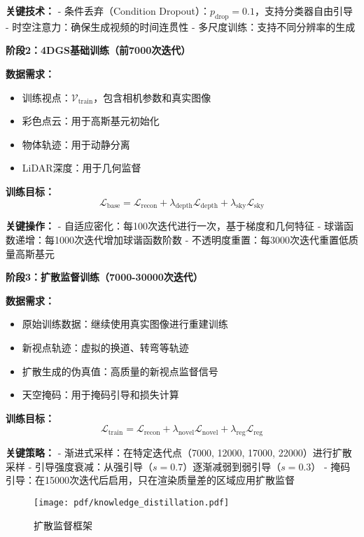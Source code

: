\textbf{关键技术：}
- 条件丢弃（Condition Dropout）：$p_{\text{drop}} = 0.1$，支持分类器自由引导
- 时空注意力：确保生成视频的时间连贯性
- 多尺度训练：支持不同分辨率的生成

\textbf{阶段2：4DGS基础训练（前7000次迭代）}

\textbf{数据需求：}
\begin{itemize}
\item 训练视点：$\mathcal{V}_{\text{train}}$，包含相机参数和真实图像
\item 彩色点云：用于高斯基元初始化
\item 物体轨迹：用于动静分离
\item LiDAR深度：用于几何监督
\end{itemize}

\textbf{训练目标：}
\begin{equation}
\mathcal{L}_{\text{base}} = \mathcal{L}_{\text{recon}} + \lambda_{\text{depth}} \mathcal{L}_{\text{depth}} + \lambda_{\text{sky}} \mathcal{L}_{\text{sky}}
\label{eq:base_training}
\end{equation}

\textbf{关键操作：}
- 自适应密化：每100次迭代进行一次，基于梯度和几何特征
- 球谐函数递增：每1000次迭代增加球谐函数阶数
- 不透明度重置：每3000次迭代重置低质量高斯基元

\textbf{阶段3：扩散监督训练（7000-30000次迭代）}

\textbf{数据需求：}
\begin{itemize}
\item 原始训练数据：继续使用真实图像进行重建训练
\item 新视点轨迹：虚拟的换道、转弯等轨迹
\item 扩散生成的伪真值：高质量的新视点监督信号
\item 天空掩码：用于掩码引导和损失计算
\end{itemize}

\textbf{训练目标：}
\begin{equation}
\mathcal{L}_{\text{train}} = \mathcal{L}_{\text{recon}} + \lambda_{\text{novel}} \mathcal{L}_{\text{novel}} + \lambda_{\text{reg}} \mathcal{L}_{\text{reg}}
\label{eq:diffusion_supervised_training}
\end{equation}

\textbf{关键策略：}
- 渐进式采样：在特定迭代点（7000, 12000, 17000, 22000）进行扩散采样
- 引导强度衰减：从强引导（$s=0.7$）逐渐减弱到弱引导（$s=0.3$）
- 掩码引导：在15000次迭代后启用，只在渲染质量差的区域应用扩散监督

\begin{figure}[htbp]
  \centering
  \texttt{[image: pdf/knowledge\_distillation.pdf]}
  \caption{扩散监督框架}
  \label{fig:diffusion-supervision}
\end{figure}

